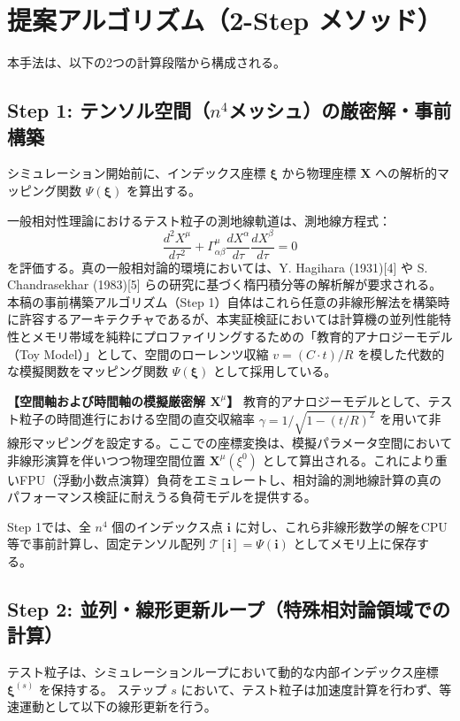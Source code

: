 \documentclass[11pt]{ltjsarticle}
\begin{document}
\section{提案アルゴリズム（2-Step メソッド）}
本手法は、以下の2つの計算段階から構成される。

\subsection{Step 1: テンソル空間（$n^4$メッシュ）の厳密解・事前構築}
シミュレーション開始前に、インデックス座標 $\boldsymbol{\xi}$ から物理座標 $\mathbf{X}$ への解析的マッピング関数 $\Psi(\boldsymbol{\xi})$ を算出する。

一般相対性理論におけるテスト粒子の測地線軌道は、測地線方程式：
\[ \frac{d^2 X^\mu}{d\tau^2} + \Gamma^\mu_{\alpha\beta} \frac{dX^\alpha}{d\tau} \frac{dX^\beta}{d\tau} = 0 \]
を評価する。真の一般相対論的環境においては、Y. Hagihara (1931)[4] や S. Chandrasekhar (1983)[5] らの研究に基づく楕円積分等の解析解が要求される。
本稿の事前構築アルゴリズム（Step 1）自体はこれら任意の非線形解法を構築時に許容するアーキテクチャであるが、本実証検証においては計算機の並列性能特性とメモリ帯域を純粋にプロファイリングするための「教育的アナロジーモデル（Toy Model）」として、空間のローレンツ収縮 $v = (C \cdot t)/R$ を模した代数的な模擬関数をマッピング関数 $\Psi(\boldsymbol{\xi})$ として採用している。

\textbf{【空間軸および時間軸の模擬厳密解 $\mathbf{X}^\mu$】}
教育的アナロジーモデルとして、テスト粒子の時間進行における空間の直交収縮率 $\gamma = 1/\sqrt{1 - (t/R)^2}$ を用いて非線形マッピングを設定する。ここでの座標変換は、模擬パラメータ空間において非線形演算を伴いつつ物理空間位置 $\mathbf{X}^\mu(\xi^0)$ として算出される。これにより重いFPU（浮動小数点演算）負荷をエミュレートし、相対論的測地線計算の真のパフォーマンス検証に耐えうる負荷モデルを提供する。

Step 1では、全 $n^4$ 個のインデックス点 $\mathbf{i}$ に対し、これら非線形数学の解をCPU等で事前計算し、固定テンソル配列 $\mathcal{T}[\mathbf{i}] = \Psi(\mathbf{i})$ としてメモリ上に保存する。

\subsection{Step 2: 並列・線形更新ループ（特殊相対論領域での計算）}
テスト粒子は、シミュレーションループにおいて動的な内部インデックス座標 $\boldsymbol{\xi}^{(s)}$ を保持する。
ステップ $s$ において、テスト粒子は加速度計算を行わず、等速運動として以下の線形更新を行う。
\end{document}
